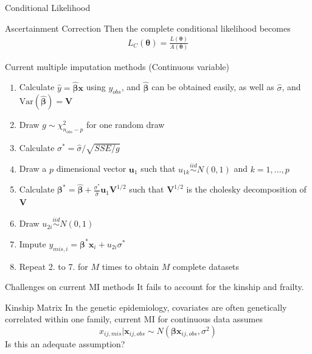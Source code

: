 \documentclass [aspectratio=169]{beamer}
\begin{document}
\begin{frame}{Conditional Likelihood}
    \begin{block}{Ascertainment Correction}
        Then the complete conditional likelihood becomes
        \begin{align} 
            L_C(\boldsymbol{\theta})=\frac{L(\boldsymbol{\theta})}{A(\boldsymbol{\theta})}
        \end{align}
    \end{block}
\end{frame}

\begin{frame}{Current multiple imputation methods (Continuous variable)} 
    \begin{enumerate} 
        \item Calculate $\hat{y}=\hat{\boldsymbol{\beta}}\mathbf{x}$ using $y_{obs}$, and $\hat{\boldsymbol{\beta}}$ can be obtained easily, as well as $\hat{\sigma}$, and $\text{Var}(\hat{\boldsymbol{\beta}})=\mathbf{V}$
        \item Draw $g\sim \chi^2_{n_{obs}-p}$ for one random draw 
        \item Calculate $\sigma^*=\hat{\sigma}/\sqrt{SSE/g}$
        \item Draw a $p$ dimensional vector $\mathbf{u}_1$ such that $u_{1k}\stackrel{iid}{\sim} N(0,1)$ and $k=1,...,p$
        \item Calculate $\boldsymbol{\beta}^*=\hat{\boldsymbol{\beta}}+\frac{\sigma^*}{\hat{\sigma}}\mathbf{u}_1\mathbf{V}^{1/2}$ such that $\mathbf{V}^{1/2}$ is the cholesky decomposition of $\mathbf{V}$
        \item Draw $u_{2i}\stackrel{iid}{\sim} N(0,1)$ 
        \item Impute $y_{mis,i}=\boldsymbol{\beta}^*\mathbf{x}_i+u_{2i}\sigma^*$ 
        \item Repeat 2. to 7. for $M$ times to obtain $M$ complete datasets
    \end{enumerate}
\end{frame}

\begin{frame}{Challenges on current MI methods}
    It fails to account for the kinship and frailty. 
\end{frame}

\begin{frame}{Kinship Matrix}
    In the genetic epidemiology, covariates are often genetically correlated within one family, current MI for continuous data assumes
    \begin{equation} 
        x_{ij,mis}|\mathbf{x}_{ij,obs}\sim N(\boldsymbol{\beta}\mathbf{x}_{ij,obs}, \sigma^2) 
    \end{equation} 
    Is this an adequate assumption? 
\end{frame}
\end{document}
